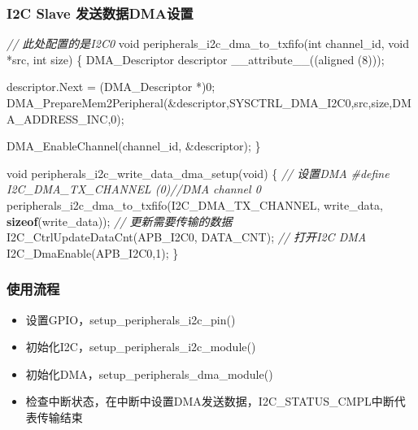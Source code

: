 \documentclass[
  12pt,
]{book}
\newenvironment{Shaded}{\begin{snugshade}}{\end{snugshade}}
\newcommand{\CommentTok}[1]{\textcolor[rgb]{0.56,0.35,0.01}{\textit{#1}}}
\newcommand{\DataTypeTok}[1]{\textcolor[rgb]{0.13,0.29,0.53}{#1}}
\newcommand{\DecValTok}[1]{\textcolor[rgb]{0.00,0.00,0.81}{#1}}
\newcommand{\KeywordTok}[1]{\textcolor[rgb]{0.13,0.29,0.53}{\textbf{#1}}}
\newcommand{\NormalTok}[1]{#1}
\newcommand{\PreprocessorTok}[1]{\textcolor[rgb]{0.56,0.35,0.01}{\textit{#1}}}
\providecommand{\tightlist}{%
  \setlength{\itemsep}{0pt}\setlength{\parskip}{0pt}}
\begin{document}
\hypertarget{i2c-slave-ux53d1ux9001ux6570ux636edmaux8bbeux7f6e}{%
\subsubsection{I2C Slave 发送数据DMA设置}\label{i2c-slave-ux53d1ux9001ux6570ux636edmaux8bbeux7f6e}}

\begin{Shaded}
\begin{Highlighting}[]
\CommentTok{// 此处配置的是I2C0}
\DataTypeTok{void}\NormalTok{ peripherals_i2c_dma_to_txfifo(}\DataTypeTok{int}\NormalTok{ channel_id, }\DataTypeTok{void}\NormalTok{ *src, }\DataTypeTok{int}\NormalTok{ size)}
\NormalTok{\{}
\NormalTok{  DMA_Descriptor descriptor __attribute__((aligned (}\DecValTok{8}\NormalTok{)));}

\NormalTok{  descriptor.Next = (DMA_Descriptor *)}\DecValTok{0}\NormalTok{;}
\NormalTok{  DMA_PrepareMem2Peripheral(&descriptor,SYSCTRL_DMA_I2C0,src,size,DMA_ADDRESS_INC,}\DecValTok{0}\NormalTok{);}

\NormalTok{  DMA_EnableChannel(channel_id, &descriptor);}
\NormalTok{\}}

\DataTypeTok{void}\NormalTok{ peripherals_i2c_write_data_dma_setup(}\DataTypeTok{void}\NormalTok{)}
\NormalTok{\{}
  \CommentTok{// 设置DMA}
  \PreprocessorTok{#define I2C_DMA_TX_CHANNEL   (0)}\CommentTok{//DMA channel 0}
\NormalTok{  peripherals_i2c_dma_to_txfifo(I2C_DMA_TX_CHANNEL, write_data, }\KeywordTok{sizeof}\NormalTok{(write_data));}
  \CommentTok{// 更新需要传输的数据}
\NormalTok{  I2C_CtrlUpdateDataCnt(APB_I2C0, DATA_CNT);}
  \CommentTok{// 打开I2C DMA}
\NormalTok{  I2C_DmaEnable(APB_I2C0,}\DecValTok{1}\NormalTok{);}
\NormalTok{\}}
\end{Highlighting}
\end{Shaded}

\hypertarget{ux4f7fux7528ux6d41ux7a0b-5}{%
\subsubsection{使用流程}\label{ux4f7fux7528ux6d41ux7a0b-5}}

\begin{itemize}
\tightlist
\item
  设置GPIO，setup\_peripherals\_i2c\_pin()
\item
  初始化I2C，setup\_peripherals\_i2c\_module()
\item
  初始化DMA，setup\_peripherals\_dma\_module()
\item
  检查中断状态，在中断中设置DMA发送数据，I2C\_STATUS\_CMPL中断代表传输结束
\end{itemize}
\end{document}
